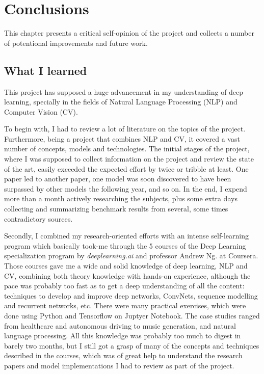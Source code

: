 \chapter{Conclusions}
\label{ch:conclusions}

This chapter presents a critical self-opinion of the project and collects a number of potentional improvements and future work.

\section{What I learned}

This project has supposed a huge advancement in my understanding of deep learning, specially in the fields of Natural Language Processing (NLP) and Computer Vision (CV). 

To begin with, I had to review a lot of literature on the topics of the project. Furthermore, being a project that combines NLP and CV, it covered a vast number of concepts, models and technologies. The initial stages of the project, where I was supposed to collect information on the project and review the state of the art, easily exceeded the expected effort by twice or tribble at least. One paper led to another paper, one model was soon discovered to have been surpassed by other models the following year, and so on. In the end, I expend more than a month actively researching the subjects, plus some extra days collecting and summarizing benchmark results from several, some times contradictory sources.

Secondly, I combined my research-oriented efforts with an intense self-learning program which basically took-me through the 5 courses of the Deep Learning specialization program by \textit{deeplearning.ai} and professor Andrew Ng. at Coursera. Those courses gave me a wide and solid knowledge of deep learning, NLP and CV, combining both theory knowledge with hands-on experience, although the pace was probably too fast as to get a deep understanding of all the content: techniques to develop and improve deep networks, ConvNets, sequence modelling and recurrent networks, etc. There were many practical exercises, which were done using Python and Tensorflow  on Juptyer Notebook. The case studies ranged from healthcare and autonomous driving to music generation, and natural language processing. All this knowledge was probably too much to digest in barely two months, but I still got a grasp of many of the concepts and techniques described in the courses, which was of great help to understand the research papers and model implementations I had to review as part of the project.

